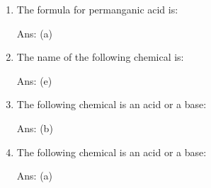 \documentclass[main.tex]{subfiles}
\begin{document}
\begin{multicols*}{2}
\begin{enumerate}
\item The formula for permanganic acid is:
\begin{enumerate}[label=(\alph*)]
\begin{flushright}\small Ans: (a)\end{flushright}
\end{enumerate}

\item The name of the following chemical is: 
\begin{enumerate}[label=(\alph*)]
\begin{flushright}\small Ans: (e)\end{flushright}
\end{enumerate}


\item The following chemical is an acid or a base: 
\begin{enumerate}[label=(\alph*)]
\begin{flushright}\small Ans: (b)\end{flushright}
\end{enumerate}

\item The following chemical is an acid or a base: 
\begin{enumerate}[label=(\alph*)]
\begin{flushright}\small Ans: (a)\end{flushright}
\end{enumerate}



\end{enumerate}
\end{multicols*}
\end{document}
